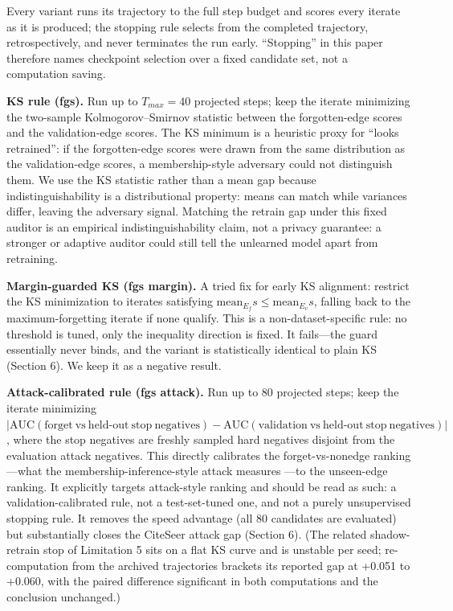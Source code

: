 \documentclass[pdflatex,sn-basic,Numbered]{sn-jnl}
\begin{document}
Every variant runs its trajectory to the full step budget and scores every iterate as it is produced; the stopping rule selects from the completed trajectory, retrospectively, and never terminates the run early. ``Stopping'' in this paper therefore names checkpoint selection over a fixed candidate set, not a computation saving.

\textbf{KS rule (fgs).} Run up to $T_{max} = 40$ projected steps; keep the iterate minimizing the two-sample Kolmogorov--Smirnov statistic \cite{massey1951} between the forgotten-edge scores and the validation-edge scores. The KS minimum is a heuristic proxy for ``looks retrained'': if the forgotten-edge scores were drawn from the same distribution as the validation-edge scores, a membership-style adversary could not distinguish them. We use the KS statistic rather than a mean gap because indistinguishability is a distributional property: means can match while variances differ, leaving the adversary signal. Matching the retrain gap under this fixed auditor is an empirical indistinguishability claim, not a privacy guarantee: a stronger or adaptive auditor could still tell the unlearned model apart from retraining.

\textbf{Margin-guarded KS (fgs margin).} A tried fix for early KS alignment: restrict the KS minimization to iterates satisfying $\mathrm{mean}_{E_f} s \leq \mathrm{mean}_{E_v} s$, falling back to the maximum-forgetting iterate if none qualify. This is a non-dataset-specific rule: no threshold is tuned, only the inequality direction is fixed. It fails---the guard essentially never binds, and the variant is statistically identical to plain KS (Section 6). We keep it as a negative result.

\textbf{Attack-calibrated rule (fgs attack).} Run up to 80 projected steps; keep the iterate minimizing $|\mathrm{AUC}(\mathrm{forget\ vs\ held\text{-}out\ stop\ negatives}) - \mathrm{AUC}(\mathrm{validation\ vs\ held\text{-}out\ stop\ negatives})|$, where the stop negatives are freshly sampled hard negatives disjoint from the evaluation attack negatives. This directly calibrates the forget-vs-nonedge ranking---what the membership-inference-style attack measures \cite{shokri2017}---to the unseen-edge ranking. It explicitly targets attack-style ranking and should be read as such: a validation-calibrated rule, not a test-set-tuned one, and not a purely unsupervised stopping rule. It removes the speed advantage (all 80 candidates are evaluated) but substantially closes the CiteSeer attack gap (Section 6). (The related shadow-retrain stop of Limitation 5 sits on a flat KS curve and is unstable per seed; re-computation from the archived trajectories brackets its reported gap at +0.051 to +0.060, with the paired difference significant in both computations and the conclusion unchanged.)
\end{document}
